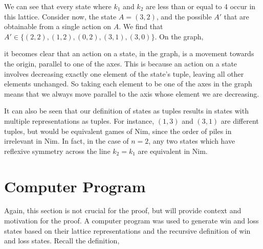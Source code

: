 \documentclass[12pt]{article}
\begin{document}
We can see that every state where $k_1$ and $k_2$ are less than or equal to 4 occur in this lattice. Consider now, the state $A = (3,2)$, and the possible $A'$ that are obtainable from a single action on $A$. We find that $A'\in\{(2,2),(1,2),(0,2),(3,1),(3,0)\}$. On the graph,
\begin{center}
\end{center}
it becomes clear that an action on a state, in the graph, is a movement towards the origin, parallel to one of the axes. This is because an action on a state involves decreasing exactly one element of the state's tuple, leaving all other elements unchanged. So taking each element to be one of the axes in the graph means that we always move parallel to the axis whose element we are decreasing.

It can also be seen that our definition of states as tuples results in states with multiple representations as tuples. For instance, $(1,3)$ and $(3,1)$ are different tuples, but would be equivalent games of Nim, since the order of piles in irrelevant in Nim. In fact, in the case of $n=2$, any two states which have reflexive symmetry across the line $k_2=k_1$ are equivalent in Nim.

\section{Computer Program}
Again, this section is not crucial for the proof, but will provide context and motivation for the proof. A computer program was used to generate win and loss states based on their lattice representations and the recursive definition of win and loss states. Recall the definition,
\end{document}
